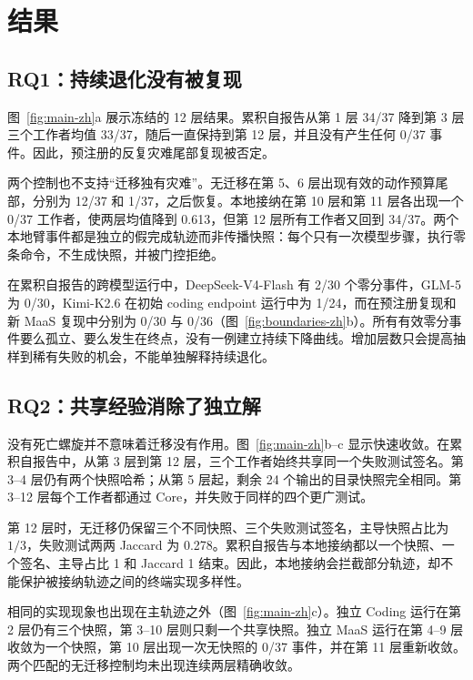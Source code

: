 \documentclass[UTF8,letterpaper,10pt,twocolumn]{ctexart}
\begin{document}
\section{结果}

\subsection{RQ1：持续退化没有被复现}

图~\ref{fig:main-zh}a 展示冻结的 12 层结果。累积自报告从第 1 层 34/37 降到第 3 层三个工作者均值 33/37，随后一直保持到第 12 层，并且没有产生任何 0/37 事件。因此，预注册的反复灾难尾部复现被否定。

两个控制也不支持“迁移独有灾难”。无迁移在第 5、6 层出现有效的动作预算尾部，分别为 12/37 和 1/37，之后恢复。本地接纳在第 10 层和第 11 层各出现一个 0/37 工作者，使两层均值降到 0.613，但第 12 层所有工作者又回到 34/37。两个本地臂事件都是独立的假完成轨迹而非传播快照：每个只有一次模型步骤，执行零条命令，不生成快照，并被门控拒绝。

在累积自报告的跨模型运行中，DeepSeek-V4-Flash 有 2/30 个零分事件，GLM-5 为 0/30，Kimi-K2.6 在初始 coding endpoint 运行中为 1/24，而在预注册复现和新 MaaS 复现中分别为 0/30 与 0/36（图~\ref{fig:boundaries-zh}b）。所有有效零分事件要么孤立、要么发生在终点，没有一例建立持续下降曲线。增加层数只会提高抽样到稀有失败的机会，不能单独解释持续退化。

\subsection{RQ2：共享经验消除了独立解}

没有死亡螺旋并不意味着迁移没有作用。图~\ref{fig:main-zh}b--c 显示快速收敛。在累积自报告中，从第 3 层到第 12 层，三个工作者始终共享同一个失败测试签名。第 3--4 层仍有两个快照哈希；从第 5 层起，剩余 24 个输出的目录快照完全相同。第 3--12 层每个工作者都通过 Core，并失败于同样的四个更广测试。

第 12 层时，无迁移仍保留三个不同快照、三个失败测试签名，主导快照占比为 $1/3$，失败测试两两 Jaccard 为 0.278。累积自报告与本地接纳都以一个快照、一个签名、主导占比 1 和 Jaccard 1 结束。因此，本地接纳会拦截部分轨迹，却不能保护被接纳轨迹之间的终端实现多样性。

相同的实现现象也出现在主轨迹之外（图~\ref{fig:main-zh}c）。独立 Coding 运行在第 2 层仍有三个快照，第 3--10 层则只剩一个共享快照。独立 MaaS 运行在第 4--9 层收敛为一个快照，第 10 层出现一次无快照的 0/37 事件，并在第 11 层重新收敛。两个匹配的无迁移控制均未出现连续两层精确收敛。
\end{document}
